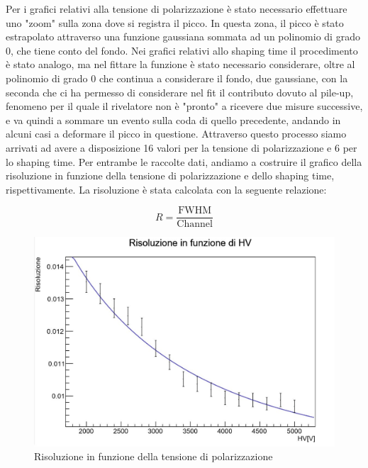 \documentclass[a4paper,10pt]{article}
\begin{document}
Per i grafici relativi alla tensione di polarizzazione è stato necessario effettuare uno "zoom" sulla zona dove si registra il picco. In questa zona, il picco è stato estrapolato attraverso una funzione gaussiana sommata ad un polinomio di grado 0, che tiene conto del fondo. Nei grafici relativi allo shaping time il procedimento è stato analogo, ma nel fittare la funzione è stato necessario considerare, oltre al polinomio di grado 0 che continua a considerare il fondo, due gaussiane, con la seconda che ci ha permesso di considerare nel fit il contributo dovuto al pile-up, fenomeno per il quale il rivelatore non è "pronto" a ricevere due misure successive, e va quindi a sommare un evento sulla coda di quello precedente, andando in alcuni casi a deformare il picco in questione. Attraverso questo processo siamo arrivati ad avere a disposizione 16 valori per la tensione di polarizzazione e 6 per lo shaping time. Per entrambe le raccolte dati, andiamo a costruire il grafico della risoluzione in funzione della tensione di polarizzazione e dello shaping time, rispettivamente. La risoluzione è stata calcolata con la seguente relazione: 

\begin{equation}
	R=\frac{\textrm{FWHM}}{\textrm{Channel}}
\end{equation}

\begin{figure}[h!]
    \centering
    \includegraphics[scale=0.45]{grafici/risoluzionehv}
    \caption{Risoluzione in funzione della tensione di polarizzazione}
\end{figure}
\end{document}
